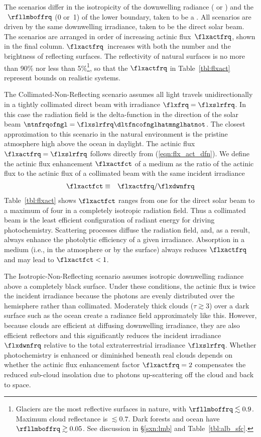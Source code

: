 \documentclass[12pt]{article}
\begin{document}
The scenarios differ in the isotropicity of the downwelling radiance
( or ) and the
~$\rfllmboffrq$ (0 or~1) of the lower boundary,
taken to be a .
All scenarios are driven by the same downwelling irradiance, 
taken to be the direct solar beam.
The scenarios are arranged in order of increasing actinic
flux~$\flxactfrq$, shown in the final column.  
$\flxactfrq$~increases with both the number and the
brightness of reflecting surfaces.
The reflectivity of natural surfaces is no more than 90\% nor less than
5\%\footnote{Glaciers are the most reflective surfaces in nature, with
$\rfllmboffrq \lesssim 0.9$. 
Maximum cloud reflectance is $\lesssim 0.7$.
Dark forests and ocean have $\rfllmboffrq \gtrsim 0.05$.
See discussion in \S\ref{sxn:lmb} and Table~\ref{tbl:alb_sfc}.}, so that 
the $\flxactfrq$ in Table~\ref{tbl:flxact} represent bounds on 
realistic systems.

The Collimated-Non-Reflecting scenario assumes all light travels
unidirectionally in a tightly collimated direct beam with irradiance
$\flxfrq = \flxslrfrq$. 
In this case the radiation field is the delta-function in the
direction of the solar beam
$\ntnfrqofngl = \flxslrfrq\dltfncofnglhatmnglhatnot$.
The closest approximation to this scenario in the natural environment
is the pristine atmosphere high above the ocean in daylight.
The actinic flux $\flxactfrq = \flxslrfrq$ follows directly from
(\ref{eqn:flx_act_dfn}).
We define the actinic flux enhancement $\flxactfct$ of a medium as 
the ratio of the actinic flux to the actinic flux of a collimated
beam with the same incident irradiance
\begin{eqnarray}
\flxactfct & \equiv & \flxactfrq/\flxdwnfrq
\label{eqn:flx_act_fct_dfn}
\end{eqnarray}
Table~\ref{tbl:flxact} shows $\flxactfct$ ranges from one for the
direct solar beam to a maximum of four in a completely isotropic
radiation field. 
Thus a collimated beam is the least efficient configuration of radiant 
energy for driving photochemistry.
Scattering processes diffuse the radiation field, and, as a result,
always enhance the photolytic efficiency of a given irradiance.
Absorption in a medium (i.e., in the atmosphere or by the surface)
always reduces $\flxactfrq$ and may lead to $\flxactfct < 1$.

The Isotropic-Non-Reflecting scenario assumes isotropic downwelling 
radiance above a completely black surface.
Under these conditions, the actinic flux is twice the incident
irradiance because the photons are evenly distributed over the
hemisphere rather than collimated. 
Moderately thick clouds ($\tau \gtrsim 3$) over a dark surface
such as the ocean create a radiance field approximately like this.
However, because clouds are efficient at diffusing downwelling
irradiance, they are also efficient reflectors and this significantly
reduces the incident irradiance $\flxdwnfrq$ relative to the total
extraterrestrial irradiance $\flxslrfrq$. 
Whether photochemistry is enhanced or diminished beneath real clouds
depends on whether the actinic flux enhancement factor 
$\flxactfrq = 2$ compensates the reduced sub-cloud insolation due to
photons up-scattering off the cloud and back to space.
\end{document}

